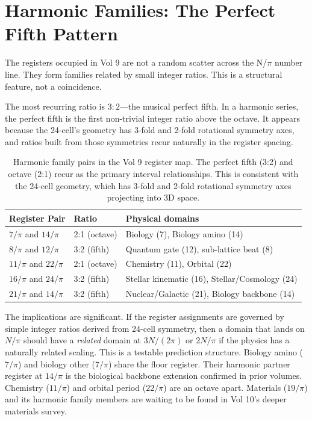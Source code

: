 \documentclass[11pt, letterpaper, openany]{book}
\begin{document}
\section{Harmonic Families: The Perfect Fifth Pattern}

The registers occupied in Vol 9 are not a random scatter across the N/$\pi$ number
line. They form families related by small integer ratios. This is a structural feature,
not a coincidence.

The most recurring ratio is $3:2$---the musical perfect fifth. In a harmonic series,
the perfect fifth is the first non-trivial integer ratio above the octave. It appears
because the 24-cell's geometry has 3-fold and 2-fold rotational symmetry axes, and
ratios built from those symmetries recur naturally in the register spacing.

\begin{table}[H]
\centering
\renewcommand{\arraystretch}{1.4}
\begin{tabular}{|l|l|l|}
\hline
\rowcolor{kishblue!10}
\textbf{Register Pair} & \textbf{Ratio} & \textbf{Physical domains} \\
\hline\hline
$7/\pi$ and $14/\pi$ & 2:1 (octave)     & Biology (7), Biology amino (14) \\
$8/\pi$ and $12/\pi$ & 3:2 (fifth)      & Quantum gate (12), sub-lattice beat (8) \\
$11/\pi$ and $22/\pi$ & 2:1 (octave)   & Chemistry (11), Orbital (22) \\
$16/\pi$ and $24/\pi$ & 3:2 (fifth)    & Stellar kinematic (16), Stellar/Cosmology (24) \\
$21/\pi$ and $14/\pi$ & 3:2 (fifth)    & Nuclear/Galactic (21), Biology backbone (14) \\
\hline
\end{tabular}
\caption{Harmonic family pairs in the Vol 9 register map. The perfect fifth (3:2)
and octave (2:1) recur as the primary interval relationships. This is consistent
with the 24-cell geometry, which has 3-fold and 2-fold rotational symmetry axes
projecting into 3D space.}
\label{tab:harmonic_families}
\end{table}

The implications are significant. If the register assignments are governed by
simple integer ratios derived from 24-cell symmetry, then a domain that lands on
$N/\pi$ should have a \emph{related} domain at $3N/(2\pi)$ or $2N/\pi$ if the
physics has a naturally related scaling. This is a testable prediction structure.
Biology amino ($7/\pi$) and biology other ($7/\pi$) share the floor register. Their
harmonic partner register at $14/\pi$ is the biological backbone extension confirmed
in prior volumes. Chemistry ($11/\pi$) and orbital period ($22/\pi$) are an octave
apart. Materials ($19/\pi$) and its harmonic family members are waiting to be found
in Vol 10's deeper materials survey.
\end{document}
